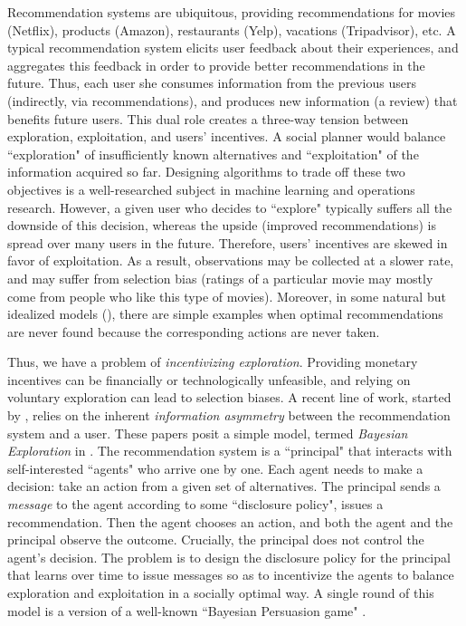 Recommendation systems are ubiquitous, providing recommendations for movies (\eg  Netflix), products (\eg  Amazon), restaurants (\eg  Yelp), vacations (\eg Tripadvisor), etc.  A typical recommendation system elicits user feedback about their experiences, and aggregates this feedback in order to provide better recommendations in the future. Thus, each user she consumes information from the previous users (indirectly, \eg via recommendations), and produces new information (\eg  a review) that benefits future users. This dual role creates a three-way tension between exploration, exploitation, and users' incentives.
A social planner would balance ``exploration" of insufficiently known alternatives and ``exploitation" of the information acquired so far. Designing algorithms to trade off these two objectives is a well-researched subject in machine learning and operations research. However, a given user who decides to ``explore" typically suffers all the downside of this decision, whereas the upside (improved recommendations) is spread over many users in the future. Therefore, users' incentives are skewed in favor of exploitation. As a result, observations may be collected at a slower rate, and may suffer from selection bias (\eg  ratings of a particular movie may mostly come from people who like this type of movies). Moreover, in some natural but idealized models (\eg  \cite{Kremer-JPE14,ICexploration-ec15}), there are simple  examples when optimal recommendations are never found because the corresponding actions are never taken.

Thus, we have a problem of \emph{incentivizing exploration}. Providing monetary incentives can be financially or technologically unfeasible, and relying on voluntary exploration can lead to selection biases. A recent line of work, started by \cite{Kremer-JPE14}, relies on the inherent \emph{information asymmetry} between the recommendation system and a user. These papers posit a simple model, termed \emph{Bayesian Exploration} in \cite{ICexplorationGames-ec16}. The recommendation system is a ``principal" that interacts with self-interested ``agents" who arrive one by one. Each agent needs to make a decision: take an action from a given set of alternatives. The principal sends a \emph{message} to the agent according to some ``disclosure policy", \eg issues a recommendation. Then the agent chooses an action, and both the agent and the principal observe the outcome.  Crucially, the principal does not control the agent's decision. The problem is to design the disclosure policy for the principal that learns over time to issue messages so as to incentivize the agents to balance exploration and exploitation in a socially optimal way.
A single round of this model is a version of a well-known ``Bayesian Persuasion game" \cite{Kamenica-aer11}.

